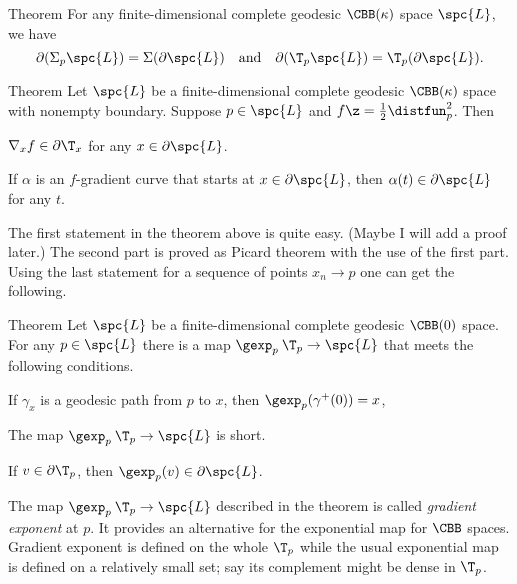 \begin{thm}{Theorem}\label{thm:partial-Sigma}
For any finite-dimensional complete geodesic $\CBB(\kappa)$ space $\spc{L}$, we have
\[\partial (\Sigma_p\spc{L})=\Sigma(\partial\spc{L})
\quad\text{and}\quad
\partial(\T_p\spc{L})=\T_p(\partial\spc{L}).\]
\end{thm}

\begin{thm}{Theorem}\label{thm:partial-grad}
Let $\spc{L}$ be a finite-dimensional complete geodesic $\CBB(\kappa)$ space with nonempty boundary.
Suppose $p\in \spc{L}$ and $f\z=\tfrac12\distfun_p^2$.
Then

\begin{subthm}{}
$\nabla_xf\in \partial\T_x$ for any $x\in\partial \spc{L}$.
\end{subthm}

\begin{subthm}{}
If $\alpha$ is an $f$-gradient curve that starts at $x\in \partial \spc{L}$, then $\alpha(t)\in \partial \spc{L}$ for any $t$.
\end{subthm}

\end{thm}

The first statement in the theorem above is quite easy.
(Maybe I will add a proof later.)
The second part is proved as Picard theorem with the use of the first part.
Using the last statement for a sequence of points $x_n\to p$ one can get the following.

\begin{thm}{Theorem}\label{thm:gexp}
Let $\spc{L}$ be a finite-dimensional complete geodesic $\CBB(0)$ space.
For any $p\in \spc{L}$ there is a map $\gexp_p\:\T_p\to \spc{L}$  that meets the following conditions.

\begin{subthm}{}
If $\gamma_x$ is a geodesic path from $p$ to $x$, then $\gexp_p(\gamma^+(0))=x$, 
\end{subthm}

\begin{subthm}{}
The map $\gexp_p\:\T_p\to \spc{L}$ is short.
\end{subthm}

\begin{subthm}{}
If $v\in \partial\T_p$, then $\gexp_p(v)\in \partial  \spc{L}$.
\end{subthm}

\end{thm}

The map $\gexp_p\:\T_p\to \spc{L}$ described in the theorem is called \emph{gradient exponent} at $p$.
It provides an alternative for the exponential map for $\CBB$ spaces.
Gradient exponent is defined on the whole $\T_p$ while
the usual exponential map is defined on a relatively small set;
say its complement might be dense in $\T_p$.



